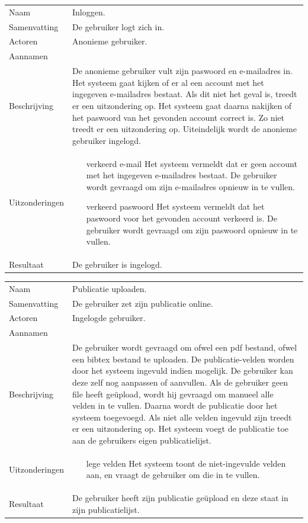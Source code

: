 \begin{longtable}{lp{10cm}}
Naam           & Inloggen.\\
Samenvatting   & De gebruiker logt zich in.\\
Actoren        & Anonieme gebruiker.\\
Aannamen       & \\
Beschrijving   & De anonieme gebruiker vult zijn paswoord en e-mailadres in. Het systeem gaat kijken of er al een account met het ingegeven e-mailadres bestaat.
Als dit niet het geval is, treedt er een uitzondering op. Het systeem gaat daarna nakijken of het paswoord van het gevonden account correct is. Zo niet treedt er een uitzondering op.
Uiteindelijk wordt de anonieme gebruiker ingelogd.\\
Uitzonderingen & 
\begin{itemize}
\item [verkeerd e-mail] Het systeem vermeldt dat er geen account met het ingegeven e-mailadres bestaat. De gebruiker wordt gevraagd om zijn e-mailadres opnieuw in te vullen.
\item [verkeerd paswoord] Het systeem vermeldt dat het paswoord voor het gevonden account verkeerd is. De gebruiker wordt gevraagd om zijn paswoord opnieuw in te vullen.
\end{itemize}\\
Resultaat      & De gebruiker is ingelogd.\\
\end{longtable}

\begin{longtable}{lp{10cm}}
Naam           & Publicatie uploaden.\\
Samenvatting   & De gebruiker zet zijn publicatie online.\\
Actoren        & Ingelogde gebruiker.\\
Aannamen       & \\
Beschrijving   & De gebruiker wordt gevraagd om ofwel een pdf bestand, ofwel een bibtex bestand te uploaden. De publicatie-velden worden door het systeem ingevuld indien mogelijk. De gebruiker kan deze zelf nog aanpassen of aanvullen.
Als de gebruiker geen file heeft geüpload, wordt hij gevraagd om manueel alle velden in te vullen. Daarna wordt de publicatie door het systeem toegevoegd.
Als niet alle velden ingevuld zijn treedt er een uitzondering op. Het systeem voegt de publicatie toe aan de gebruikers eigen publicatielijst.\\
Uitzonderingen & 
\begin{itemize}
\item [lege velden] Het systeem toont de niet-ingevulde velden aan, en vraagt de gebruiker om die in te vullen.
\end{itemize}\\
Resultaat      & De gebruiker heeft zijn publicatie geüpload en deze staat in zijn publicatielijst.\\
\end{longtable}

